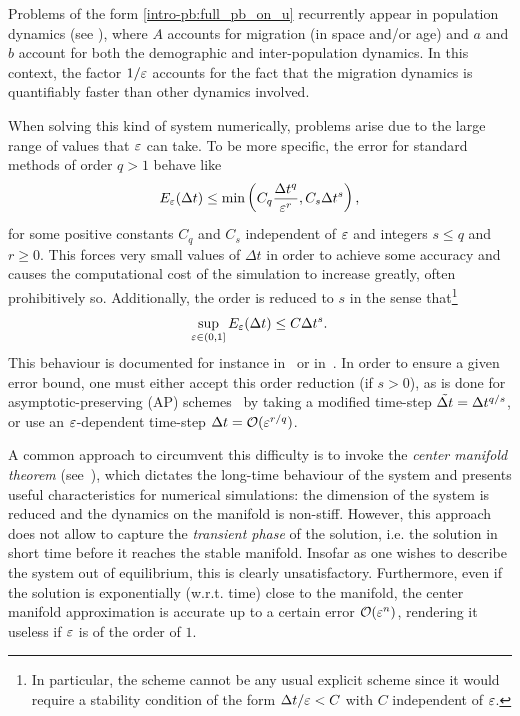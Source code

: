 %

Problems of the form \eqref{intro-pb:full_pb_on_u} recurrently appear in
population dynamics (see \cite{greiner.1994.singular, auger.1996.emergence,
sanchez.2000.singular, castella.2018.analysis}), where $A$ accounts for
migration (in space and/or age) and $a$ and $b$ account for both the
demographic and inter-population dynamics. In this context, the factor
$1/\varepsilon$ accounts for the fact that the migration dynamics is quantifiably
faster than other dynamics involved.

%

\medskip
When solving this kind of system numerically, problems arise due to the
large range of values that $\varepsilon$ can take. To be more specific, the error
for standard methods of order $q > 1$ behave like 
$$
E_{\varepsilon}(\Delta t) \leq \min\left(C_q \frac{\Delta t^q}{\varepsilon^r} , C_s \Delta t^s\right),
$$
for some positive constants $C_q$ and $C_s$ independent of $\varepsilon$ and
integers $s \leq q$ and $r \geq 0$. This  forces very small values of
$\Delta t$  in order to achieve some accuracy and causes the computational
cost of the simulation to increase greatly, often prohibitively so.
Additionally, the order is reduced to $s$ in the sense that\footnote{In
particular, the scheme cannot be any usual explicit scheme since it would
require a stability condition of the form $\Delta t/\varepsilon < C$ with $C$
independent of $\varepsilon$. } 
\begin{equation} \label{intro_eq:unif_error}
\sup_{\varepsilon \in (0,1]} E_{\varepsilon}(\Delta t) \leq C \Delta t^s . 
\end{equation} 
This behaviour is documented for instance
in~\cite[Section~IV.15]{hairer.1996.solving} or in~\cite{hundsdorfer.2007.imex}.
In order to ensure a given error bound, one must either accept this order
reduction (if $s > 0$), as is done for asymptotic-preserving (AP)
schemes~\cite{jin.1999.efficient} by taking a modified time-step
$\tilde{\Delta t} = \Delta t^{q/s}$, or use an $\varepsilon$-dependent time-step $\Delta t =
\mathcal{O}(\varepsilon^{r/q})$. 

A common approach to circumvent this difficulty is to invoke the
\textit{center manifold theorem} (see~\cite{vasileva.1963.asymptotic, carr.1982.applications,sakamoto.1990.invariant}), which dictates the long-time behaviour of the
system and presents useful characteristics for numerical simulations: the
dimension of the system is reduced and the dynamics on the manifold is
non-stiff. However, this approach does not allow to capture the
\textit{transient phase} of the solution, i.e. the solution in short time
before it reaches the stable manifold. Insofar as one wishes to describe
the system out of equilibrium, this is clearly unsatisfactory.
Furthermore, even if the solution is exponentially (w.r.t. time) close to
the manifold, the center manifold approximation is accurate up to a
certain error $\mathcal{O}(\varepsilon^n)$, rendering it useless if $\varepsilon$ is of the
order of $1$. 

